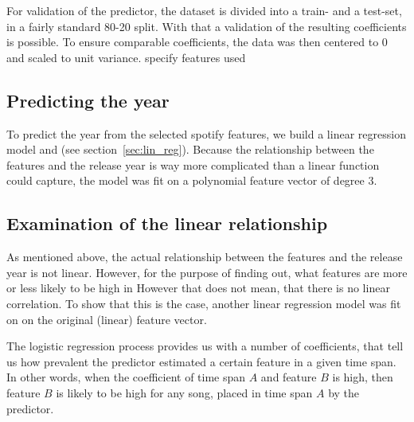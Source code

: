 \documentclass{article}
\begin{document}
For validation of the predictor, the dataset is divided into a train- and a test-set, in a fairly standard 80-20 split. With that a validation of the resulting coefficients is possible.
To ensure comparable coefficients, the data was then centered to 0 and scaled to unit variance. 
\answerTODO specify features used

\subsection{Predicting the year}

To predict the year from the selected spotify features, we build a linear regression model and (see section~\ref{sec:lin_reg}). Because the relationship between the features and the release year is way more complicated than a linear function could capture, the model was fit on a polynomial feature vector of degree 3.

\subsection{Examination of the linear relationship}

As mentioned above, the actual relationship between the features and the release year is not linear. However, for the purpose of finding out, what features are more or less likely to be high in 
However that does not mean, that there is no linear correlation. To show that this is the case, another linear regression model was fit on on the original (linear) feature vector.






The logistic regression process provides us with a number of coefficients, that tell us how prevalent the predictor estimated a certain feature in a given time span. In other words, when the coefficient of time span $A$ and feature $B$ is high, then feature $B$ is likely to be high for any song, placed in time span $A$ by the predictor.
\end{document}

